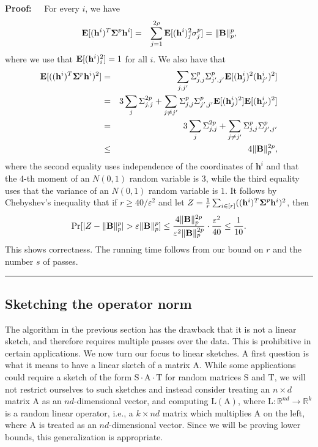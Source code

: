 \documentclass[11pt]{article}
\newenvironment{proof}{\begin{trivlist} \item {\bf Proof:~~}}
  {\qed\end{trivlist}}
\newcommand{\mat}[1]{{\ensuremath{\bm{\mathrm{#1}}}}}
\def\matA{\mat{A}}
\def\matB{\mat{B}}
\def\matL{\mat{L}}
\def\matS{\mat{S}}
\def\matT{\mat{T}}
\def\frac#1#2{{#1\over #2}}
\def\qed{\hfill\rule{2mm}{2mm}}
\def\h{{\mathbf h}}
\newcommand{\eps}{\varepsilon}
\begin{document}
\begin{proof}
For every $i$, we have
\begin{eqnarray*}
{\bf E}[(\h^i)^T \mat\Sigma^p \h^i] & = & \sum_{j=1}^{2\rho} {\bf E}[(\h^i)_j^2 \sigma_j^p] = \|\matB\|_p^p,
\end{eqnarray*}
where we use that ${\bf E}[(\h^i)_i^2] = 1$ for all $i$. We also have that
\begin{eqnarray*}
{\bf E}[((\h^i)^T \mat\Sigma^p \h^i)^2] & = & \sum_{j,j'} \Sigma^p_{j,j} \Sigma^p_{j',j'} {\bf E}[(\h^i_{j})^2 (\h^i_{j'})^2]\\
& = & 3 \sum_j \Sigma_{j,j}^{2p} + \sum_{j \neq j'}  \Sigma_{j,j}^p \Sigma_{j',j'}^p {\bf E}[(\h^i_{j})^2] {\bf E}[(\h^i_{j'})^2]\\
& = & 3 \sum_j \Sigma_{j,j}^{2p} + \sum_{j \neq j'}  \Sigma_{j,j}^p \Sigma_{j',j'}^p \\
& \leq & 4 \|\matB\|_p^{2p},
\end{eqnarray*}
where the second equality uses independence of the coordinates of $\h^i$ and that the $4$-th moment of an $N(0,1)$ random variable is $3$, while the third equality uses that the variance
of an $N(0,1)$ random variable is $1$. It follows by Chebyshev's inequality that if
$r \geq 40/\eps^2$ and let $Z = \frac{1}{r}\sum_{i \in [r]} ((\h^i)^T \mat\Sigma^p \h^i)^2$, then
$$\Pr[|Z - \|\matB\|_p^p| > \eps \|\matB\|_p^p] \leq \frac{4 \|\matB\|_p^{2p}}{\eps^2 \|\matB\|_p^{2p}} \cdot \frac{\eps^2}{40}
\leq \frac{1}{10}.$$
This shows correctness. The running time follows from our bound on $r$ and the number $s$ of passes. 
\end{proof}

\subsection{Sketching the operator norm}\label{sec:oded}
The algorithm in the previous section 
has the drawback that it is not a linear sketch, and therefore requires multiple passes
over the data. This is prohibitive in certain applications. We now turn our focus to linear sketches. A first
question is what it means to have a linear sketch of a matrix $\matA$. While some applications could require
a sketch of the form $\matS \cdot \matA \cdot \matT$ for random matrices $\matS$ and $\matT$, we will not restrict ourselves
to such sketches and instead consider treating an $n \times d$ matrix $\matA$ as an $nd$-dimensional vector, 
and computing $\matL(\matA)$, where $\matL:\mathbb{R}^{nd} \rightarrow \mathbb{R}^k$ is a random linear operator, i.e.,
a $k \times nd$ matrix which multiplies $\matA$ on the left, where $\matA$ is treated as an $nd$-dimensional vector.
Since we will be proving lower bounds, this generalization is appropriate. 
\end{document}
